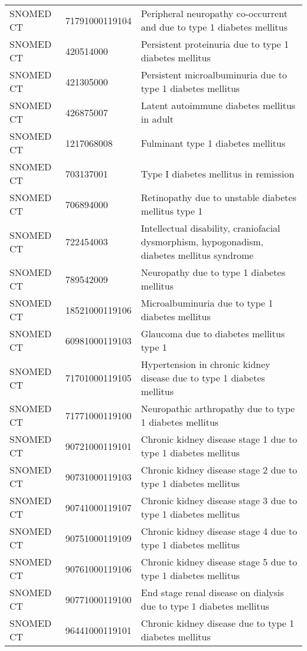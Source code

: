 \begin{longtable}{p{}p{}p{}}
  SNOMED CT & 71791000119104 & Peripheral neuropathy co-occurrent and due to type 1 diabetes mellitus \\ 
  SNOMED CT & 420514000 & Persistent proteinuria due to type 1 diabetes mellitus \\ 
  SNOMED CT & 421305000 & Persistent microalbuminuria due to type 1 diabetes mellitus \\ 
  SNOMED CT & 426875007 & Latent autoimmune diabetes mellitus in adult \\ 
  SNOMED CT & 1217068008 & Fulminant type 1 diabetes mellitus \\ 
  SNOMED CT & 703137001 & Type I diabetes mellitus in remission \\ 
  SNOMED CT & 706894000 & Retinopathy due to unstable diabetes mellitus type 1 \\ 
  SNOMED CT & 722454003 & Intellectual disability, craniofacial dysmorphism, hypogonadism, diabetes mellitus syndrome \\ 
  SNOMED CT & 789542009 & Neuropathy due to type 1 diabetes mellitus \\ 
  SNOMED CT & 18521000119106 & Microalbuminuria due to type 1 diabetes mellitus \\ 
  SNOMED CT & 60981000119103 & Glaucoma due to diabetes mellitus type 1 \\ 
  SNOMED CT & 71701000119105 & Hypertension in chronic kidney disease due to type 1 diabetes mellitus \\ 
  SNOMED CT & 71771000119100 & Neuropathic arthropathy due to type 1 diabetes mellitus \\ 
  SNOMED CT & 90721000119101 & Chronic kidney disease stage 1 due to type 1 diabetes mellitus \\ 
  SNOMED CT & 90731000119103 & Chronic kidney disease stage 2 due to type 1 diabetes mellitus \\ 
  SNOMED CT & 90741000119107 & Chronic kidney disease stage 3 due to type 1 diabetes mellitus \\ 
  SNOMED CT & 90751000119109 & Chronic kidney disease stage 4 due to type 1 diabetes mellitus \\ 
  SNOMED CT & 90761000119106 & Chronic kidney disease stage 5 due to type 1 diabetes mellitus \\ 
  SNOMED CT & 90771000119100 & End stage renal disease on dialysis due to type 1 diabetes mellitus \\ 
  SNOMED CT & 96441000119101 & Chronic kidney disease due to type 1 diabetes mellitus \\ 

\end{longtable}
